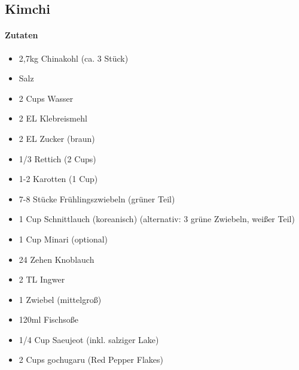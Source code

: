 \newpage
\subsection{Kimchi}
\paragraph{Zutaten}
\begin{itemize}[noitemsep]
	\item 2,7kg Chinakohl (ca. 3 Stück)
	\item Salz
	\vspace{0.5cm}
	\item 2 Cups Wasser
	\item 2 EL Klebreismehl 
	\item 2 EL Zucker (braun)
	\vspace{0.5cm}
	\item 1/3 Rettich (2 Cups)
	\item 1-2 Karotten (1 Cup)
	\item 7-8 Stücke Frühlingszwiebeln (grüner Teil)
	\item 1 Cup Schnittlauch (koreanisch) (alternativ: 3 grüne Zwiebeln, weißer Teil)
	\item 1 Cup Minari (optional)
	\vspace{0.5cm}
	\item 24 Zehen Knoblauch
	\item 2 TL Ingwer
	\item 1 Zwiebel (mittelgroß)
	\item 120ml Fischsoße
	\item 1/4 Cup Saeujeot (inkl. salziger Lake)
	\item 2 Cups gochugaru (Red Pepper Flakes)
\end{itemize}

